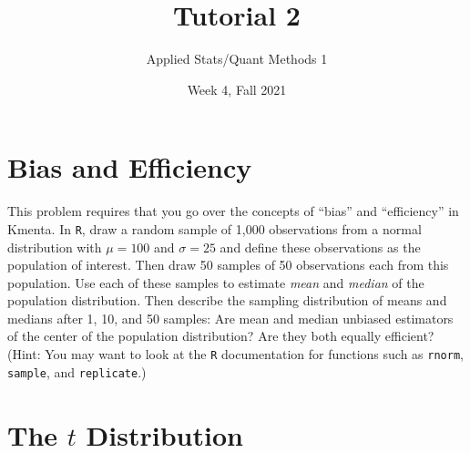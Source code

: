 \documentclass[12pt,letterpaper]{article}
\title{Tutorial 2}
\date{Week 4, Fall 2021}
\author{Applied Stats/Quant Methods 1}
\begin{document}
	\maketitle
	
%	
%


\section{Bias and Efficiency}

This problem requires that you go over the concepts of ``bias'' and ``efficiency'' in Kmenta. In \texttt{R}, draw a random sample of 1,000 observations from a normal distribution with $\mu=100$ and $\sigma=25$ and define these observations as the population of interest.  Then draw 50 samples of 50 observations each from this population.  Use each of these samples to estimate \emph{mean} and \emph{median} of the population distribution.  Then describe the sampling distribution of means and medians after 1, 10, and 50 samples: Are mean and median unbiased estimators of the center of the population distribution?  Are they both equally efficient? (Hint: You may want to look at the \texttt{R} documentation for functions such as \texttt{rnorm}, \texttt{sample}, and \texttt{replicate}.)



\section{The $t$ Distribution}
\end{document}
